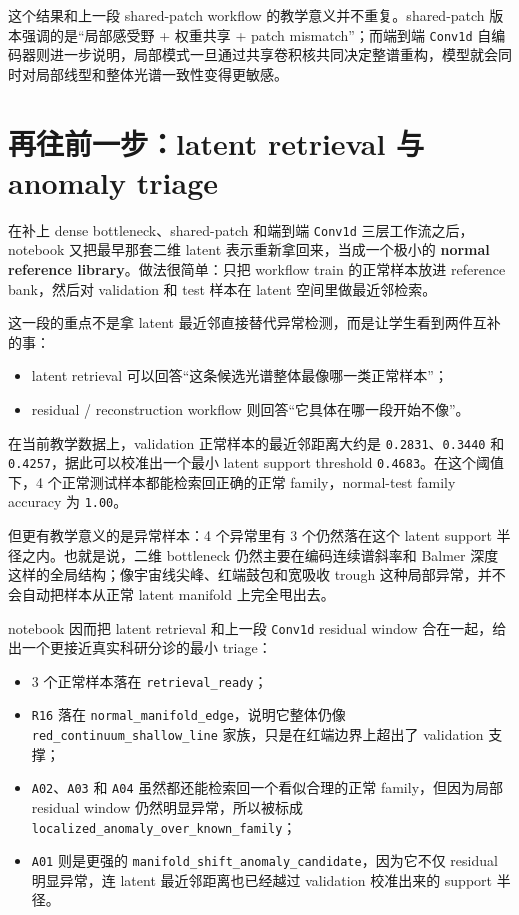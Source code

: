 这个结果和上一段 shared-patch workflow 的教学意义并不重复。shared-patch 版本强调的是“局部感受野 + 权重共享 + patch mismatch”；而端到端 \texttt{Conv1d} 自编码器则进一步说明，局部模式一旦通过共享卷积核共同决定整谱重构，模型就会同时对局部线型和整体光谱一致性变得更敏感。

\section{再往前一步：latent retrieval 与 anomaly triage}

在补上 dense bottleneck、shared-patch 和端到端 \texttt{Conv1d} 三层工作流之后，notebook 又把最早那套二维 latent 表示重新拿回来，当成一个极小的 \textbf{normal reference library}。做法很简单：只把 workflow train 的正常样本放进 reference bank，然后对 validation 和 test 样本在 latent 空间里做最近邻检索。

这一段的重点不是拿 latent 最近邻直接替代异常检测，而是让学生看到两件互补的事：

\begin{itemize}
    \item latent retrieval 可以回答“这条候选光谱整体最像哪一类正常样本”；
    \item residual / reconstruction workflow 则回答“它具体在哪一段开始不像”。
\end{itemize}

在当前教学数据上，validation 正常样本的最近邻距离大约是 \texttt{0.2831}、\texttt{0.3440} 和 \texttt{0.4257}，据此可以校准出一个最小 latent support threshold \texttt{0.4683}。在这个阈值下，4 个正常测试样本都能检索回正确的正常 family，normal-test family accuracy 为 \texttt{1.00}。

但更有教学意义的是异常样本：4 个异常里有 3 个仍然落在这个 latent support 半径之内。也就是说，二维 bottleneck 仍然主要在编码连续谱斜率和 Balmer 深度这样的全局结构；像宇宙线尖峰、红端鼓包和宽吸收 trough 这种局部异常，并不会自动把样本从正常 latent manifold 上完全甩出去。

notebook 因而把 latent retrieval 和上一段 \texttt{Conv1d} residual window 合在一起，给出一个更接近真实科研分诊的最小 triage：

\begin{itemize}
    \item 3 个正常样本落在 \texttt{retrieval\_ready}；
    \item \texttt{R16} 落在 \texttt{normal\_manifold\_edge}，说明它整体仍像 \texttt{red\_continuum\_shallow\_line} 家族，只是在红端边界上超出了 validation 支撑；
    \item \texttt{A02}、\texttt{A03} 和 \texttt{A04} 虽然都还能检索回一个看似合理的正常 family，但因为局部 residual window 仍然明显异常，所以被标成 \texttt{localized\_anomaly\_over\_known\_family}；
    \item \texttt{A01} 则是更强的 \texttt{manifold\_shift\_anomaly\_candidate}，因为它不仅 residual 明显异常，连 latent 最近邻距离也已经越过 validation 校准出来的 support 半径。
\end{itemize}

